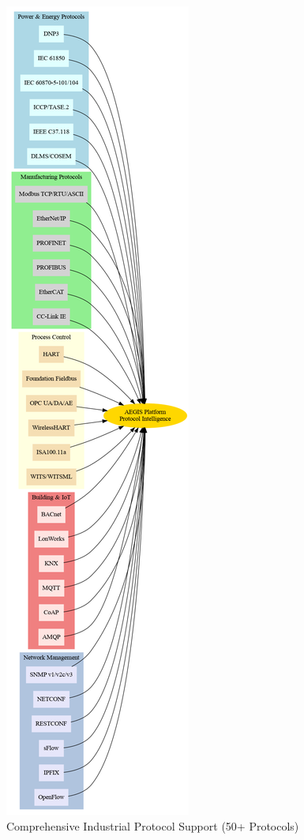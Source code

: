 \documentclass[12pt,a4paper]{article}
\begin{document}
\begin{figure}[H]
\centering
\includegraphics[width=\textwidth]{diagrams/protocol_matrix.png}
\caption{Comprehensive Industrial Protocol Support (50+ Protocols)}
\label{fig:protocols}
\end{figure}
\end{document}
